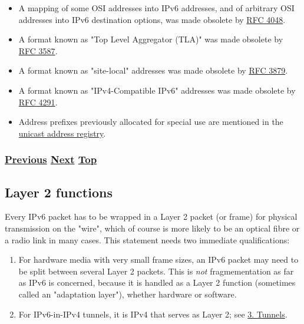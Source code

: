 \documentclass[
]{article}
\begin{document}
\begin{itemize}
\item
  A mapping of some OSI addresses into IPv6 addresses, and of arbitrary
  OSI addresses into IPv6 destination options, was made obsolete by
  \href{https://www.rfc-editor.org/info/rfc4048}{RFC 4048}.
\item
  A format known as "Top Level Aggregator (TLA)" was made obsolete by
  \href{https://www.rfc-editor.org/info/rfc3587}{RFC 3587}.
\item
  A format known as "site-local" addresses was made obsolete by
  \href{https://www.rfc-editor.org/info/rfc3879}{RFC 3879}.
\item
  A format known as "IPv4-Compatible IPv6" addresses was made obsolete
  by \href{https://www.rfc-editor.org/info/rfc4291}{RFC 4291}.
\item
  Address prefixes previously allocated for special use are mentioned in
  the
  \href{https://www.iana.org/assignments/ipv6-unicast-address-assignments/ipv6-unicast-address-assignments.xhtml}{unicast
  address registry}.
\end{itemize}

\subsubsection{\texorpdfstring{\hyperref[packet-format]{Previous}
\hyperref[layer-2-functions]{Next}
\hyperref[ipv6-basic-technology]{Top}}{Previous Next Top}}\label{previous-next-top-9}

\pagebreak

\subsection{Layer 2 functions}\label{layer-2-functions}

Every IPv6 packet has to be wrapped in a Layer 2 packet (or frame) for
physical transmission on the "wire", which of course is more likely to
be an optical fibre or a radio link in many cases. This statement needs
two immediate qualifications:

\begin{enumerate}
\def\labelenumi{\arabic{enumi}.}
\item
  For hardware media with very small frame sizes, an IPv6 packet may
  need to be split between several Layer 2 packets. This is \emph{not}
  fragmementation as far as IPv6 is concerned, because it is handled as
  a Layer 2 function (sometimes called an "adaptation layer"), whether
  hardware or software.
\item
  For IPv6-in-IPv4 tunnels, it is IPv4 that serves as Layer 2; see
  \hyperref[tunnels]{3. Tunnels}.
\end{enumerate}
\end{document}
